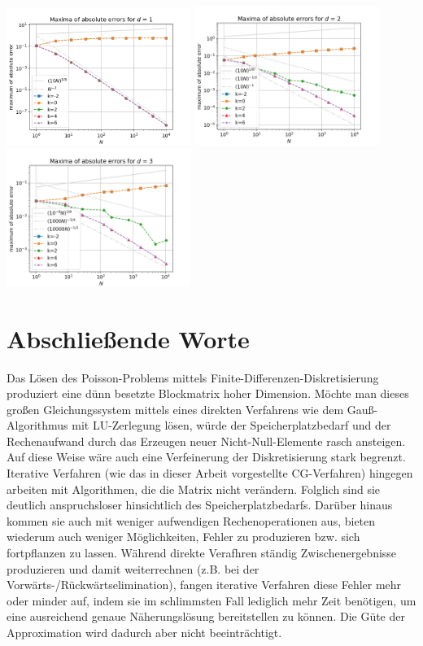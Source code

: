 \documentclass{scrartcl}
\begin{document}
{
  \centering
    \includegraphics[width=0.45\textwidth]{Grafiken/epsilon_d1}
    \includegraphics[width=0.45\textwidth]{Grafiken/epsilon_d2}
    \includegraphics[width=0.45\textwidth]{Grafiken/epsilon_d3}
    \vspace{-0.2cm}
}
\vspace{0.5cm}


\pagebreak
\section{Abschließende Worte}
Das Lösen des Poisson-Problems mittels Finite-Differenzen-Diskretisierung produziert eine dünn besetzte Blockmatrix hoher Dimension.
Möchte man dieses großen Gleichungssystem mittels eines direkten Verfahrens wie dem Gauß-Algorithmus mit LU-Zerlegung lösen, würde der Speicherplatzbedarf und der Rechenaufwand durch das Erzeugen neuer Nicht-Null-Elemente rasch ansteigen.
Auf diese Weise wäre auch eine Verfeinerung der Diskretisierung stark begrenzt.
Iterative Verfahren (wie das in dieser Arbeit vorgestellte CG-Verfahren) hingegen arbeiten mit Algorithmen, die die Matrix nicht verändern.
Folglich sind sie deutlich anspruchsloser hinsichtlich des Speicherplatzbedarfs.
Darüber hinaus kommen sie auch mit weniger aufwendigen Rechenoperationen aus, bieten wiederum auch weniger Möglichkeiten, Fehler zu produzieren bzw. sich fortpflanzen zu lassen.
Während direkte Verafhren ständig Zwischenergebnisse produzieren und damit weiterrechnen (z.B. bei der Vorwärts-/Rückwärtselimination), fangen iterative Verfahren diese Fehler mehr oder minder auf, indem sie im schlimmsten Fall lediglich mehr Zeit benötigen, um eine ausreichend genaue Näherungslösung bereitstellen zu können.
Die Güte der Approximation wird dadurch aber nicht beeinträchtigt.\\
\end{document}
